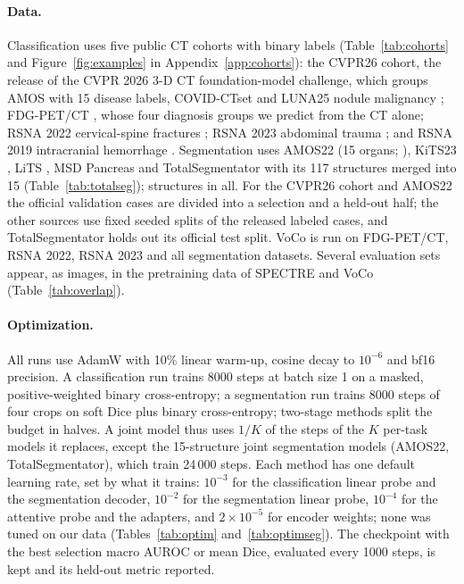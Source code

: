 \paragraph{Data.} Classification uses five public CT cohorts with \numLabelsN{} binary labels (Table~\ref{tab:cohorts} and Figure~\ref{fig:examples} in Appendix~\ref{app:cohorts}): the CVPR26 cohort, the release of the CVPR 2026 3-D CT foundation-model challenge, which groups AMOS \citep{ji2022amos} with 15 disease labels, COVID-CTset \citep{rahimzadeh2021covidctset} and LUNA25 nodule malignancy \citep{peeters2026luna25}; FDG-PET/CT \citep{gatidis2022fdgpetct}, whose four diagnosis groups we predict from the CT alone; RSNA 2022 cervical-spine fractures \citep{lin2023rsnacsfdata}; RSNA 2023 abdominal trauma \citep{rudie2024ratic}; and RSNA 2019 intracranial hemorrhage \citep{flanders2020rsnaich}. Segmentation uses AMOS22 (15 organs; \citealp{ji2022amos}), KiTS23 \citep{heller2023kits21}, LiTS \citep{bilic2023lits}, MSD Pancreas \citep{antonelli2022msd} and TotalSegmentator \citep{wasserthal2023totalsegmentator,wasserthal2026totalsegdata} with its 117 structures merged into 15 (Table~\ref{tab:totalseg}); \numStructuresN{} structures in all. For the CVPR26 cohort and AMOS22 the official validation cases are divided into a selection and a held-out half; the other sources use fixed seeded splits of the released labeled cases, and TotalSegmentator holds out its official test split. VoCo is run on FDG-PET/CT, RSNA 2022, RSNA 2023 and all segmentation datasets. Several evaluation sets appear, as images, in the pretraining data of SPECTRE and VoCo (Table~\ref{tab:overlap}).

\paragraph{Optimization.} All runs use AdamW with 10\% linear warm-up, cosine decay to $10^{-6}$ and bf16 precision. A classification run trains 8000 steps at batch size 1 on a masked, positive-weighted binary cross-entropy; a segmentation run trains 8000 steps of four crops on soft Dice plus binary cross-entropy; two-stage methods split the budget in halves. A joint model thus uses $1/K$ of the steps of the $K$ per-task models it replaces, except the 15-structure joint segmentation models (AMOS22, TotalSegmentator), which train 24\,000 steps. Each method has one default learning rate, set by what it trains: $10^{-3}$ for the classification linear probe and the segmentation decoder, $10^{-2}$ for the segmentation linear probe, $10^{-4}$ for the attentive probe and the adapters, and $2\times10^{-5}$ for encoder weights; none was tuned on our data (Tables~\ref{tab:optim} and~\ref{tab:optimseg}). The checkpoint with the best selection macro AUROC or mean Dice, evaluated every 1000 steps, is kept and its held-out metric reported.


